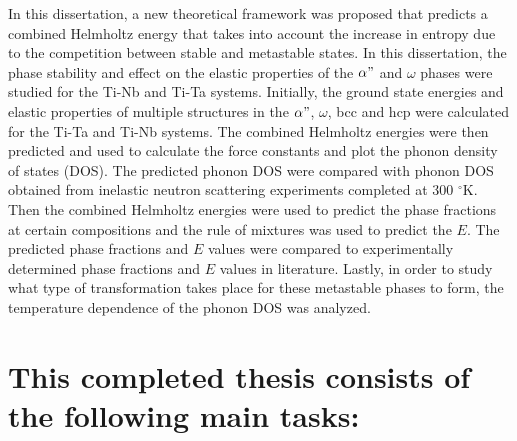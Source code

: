 In this dissertation, a new theoretical framework was proposed that predicts a combined Helmholtz energy that takes into account the increase in entropy due to the competition between stable and metastable states. In this dissertation, the phase stability and effect on the elastic properties of the $\alpha"$ and $\omega$ phases were studied for the Ti-Nb and Ti-Ta systems. Initially, the ground state energies and elastic properties of multiple structures in the $\alpha"$, $\omega$, bcc and hcp were calculated for the Ti-Ta and Ti-Nb systems. The combined Helmholtz energies were then predicted and used to calculate the force constants and plot the phonon density of states (DOS). The predicted phonon DOS were compared with phonon DOS obtained from inelastic neutron scattering experiments completed at 300 $^\circ$K. Then the combined Helmholtz energies were used to predict the phase fractions at certain compositions and the rule of mixtures was used to predict the $E$. The predicted phase fractions and $E$ values were compared to experimentally determined phase fractions and $E$ values in literature. Lastly, in order to study what type of transformation takes place for these metastable phases to form, the temperature dependence of the phonon DOS was analyzed.

\pagebreak
\section*{This completed thesis consists of the following main tasks:}

